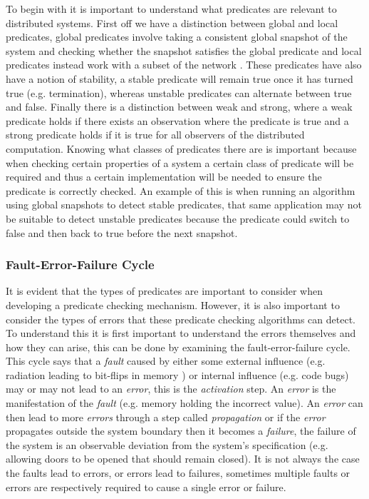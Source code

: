 To begin with it is important to understand what predicates are relevant to distributed systems. First off we have a distinction between global and local predicates, global predicates involve taking a consistent global snapshot of the system and checking whether the snapshot satisfies the global predicate \cite{277788} and local predicates instead work with a subset of the network \cite{553309}. These predicates have also have a notion of stability, a stable predicate will remain true once it has turned true (e.g. termination), whereas unstable predicates can alternate between true and false. Finally there is a distinction between weak and strong, where a weak predicate holds if there exists an observation where the predicate is true and a strong predicate holds if it is true for all observers of the distributed computation\cite{553309,Cooper:1991:CDG:127695.122774}. Knowing what classes of predicates there are is important because when checking certain properties of a system a certain class of predicate will be required and thus a certain implementation will be needed to ensure the predicate is correctly checked. An example of this is when running an algorithm using global snapshots to detect stable predicates, that same application may not be suitable to detect unstable predicates because the predicate could switch to false and then back to true before the next snapshot.

\subsubsection{Fault-Error-Failure Cycle}

It is evident that the types of predicates are important to consider when developing a predicate checking mechanism. However, it is also important to consider the types of errors that these predicate checking algorithms can detect. To understand this it is first important to understand the errors themselves and how they can arise, this can be done by examining the fault-error-failure cycle. This cycle says that a \emph{fault} caused by either some external influence (e.g. radiation leading to bit-flips in memory \cite{1017791}) or internal influence (e.g. code bugs) may or may not lead to an \emph{error}, this is the \emph{activation} step. An \emph{error} is the manifestation of the \emph{fault} (e.g. memory holding the incorrect value). An \emph{error} can then lead to more \emph{errors} through a step called \emph{propagation} or if the \emph{error} propagates outside the system boundary then it becomes a \emph{failure}, the failure of the system is an observable deviation from the system's specification (e.g. allowing doors to be opened that should remain closed). It is not always the case the faults lead to errors, or errors lead to failures, sometimes multiple faults or errors are respectively required to cause a single error or failure. \cite{1335465}

